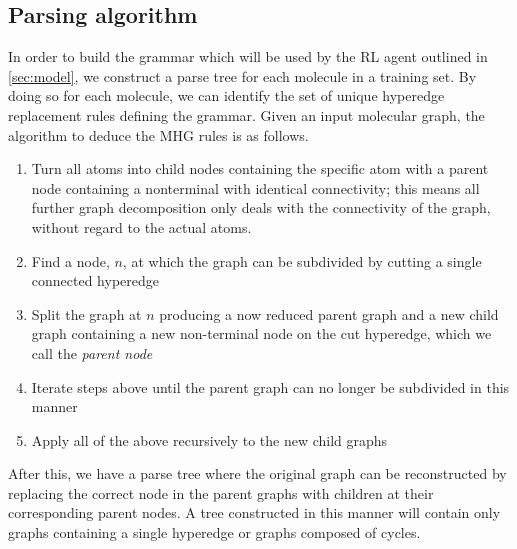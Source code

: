 \documentclass{article}
\begin{document}
\subsection{Parsing algorithm}\label{sec:parsing}
In order to build the grammar which will be used by the RL agent outlined in \ref{sec:model}, we  construct a parse tree for each molecule in a training set. By doing so for each molecule, we can identify the set of unique hyperedge replacement rules defining the grammar. Given an input molecular graph, the algorithm to deduce the MHG rules is as follows.
\begin{enumerate}
	\item Turn all atoms into child nodes containing the specific atom with a parent node containing a nonterminal with identical connectivity; this means all further graph decomposition only deals with the connectivity of the graph, without regard to the actual atoms.
	\item Find a node, $n$, at which the graph can be subdivided by cutting a single connected hyperedge
    \item Split the graph at $n$ producing a now reduced parent graph and a new child graph containing a new non-terminal node on the cut hyperedge, which we call the {\em parent node}
    \item Iterate steps above until the parent graph can no longer be subdivided in this manner
    \item Apply all of the above recursively to the new child graphs
\end{enumerate}
After this, we have a parse tree where the original graph can be reconstructed by replacing the correct node in the parent graphs with children at their corresponding parent nodes. A tree constructed in this manner will contain only graphs containing a single hyperedge or graphs composed of cycles.
\end{document}
